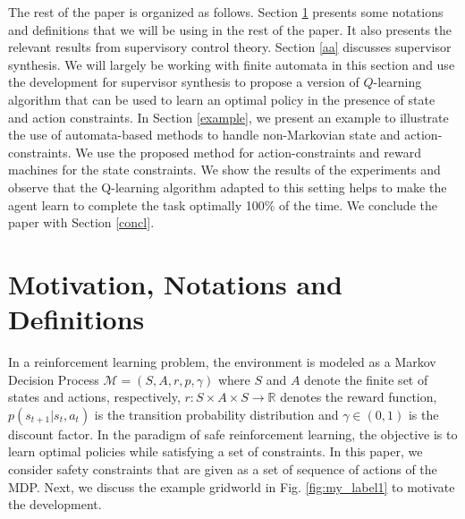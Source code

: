 \documentclass[letterpaper, 10 pt, conference]{ieeeconf}
\begin{document}
The rest of the paper is organized as follows. Section \ref{model} presents some notations and definitions that we will be using in the rest of the paper. It also presents the relevant results from supervisory control theory. Section \ref{aa} discusses supervisor synthesis. We will largely be working with finite automata in this section and use the development for supervisor synthesis to propose a version of $Q$-learning algorithm \cite{watkins1992q} that can be used to learn an optimal policy in the presence of state and action constraints. In Section \ref{example}, we present an example to illustrate the use of automata-based methods to handle non-Markovian state and action-constraints. We use the proposed method for action-constraints and reward machines\cite{icarte2018using} for the state constraints. %
We show the results of the experiments and observe that the Q-learning algorithm adapted to this setting helps to make the agent learn to complete the task optimally 100\% of the time. We conclude the paper with Section \ref{concl}.


\section{Motivation, Notations and Definitions}\label{model}
In a reinforcement learning problem, the environment is modeled as a Markov Decision Process $\mathcal{M} = (S, A, r, p, \gamma)$ where $S$ and $A$ denote the finite set of states and actions, respectively, $r: S \times A \times S \rightarrow \mathbb{R}$ denotes the reward function, $p(s_{t+1}|s_t, a_t)$ is the transition probability distribution and $\gamma \in (0,1)$ is the discount factor. In the paradigm of safe reinforcement learning, the objective is to learn optimal policies while satisfying a set of constraints. In this paper, we consider safety constraints that are given as a set of sequence of actions of the MDP. Next, we discuss the example gridworld in Fig. \ref{fig:my_label1} to motivate the development. 
\end{document}
